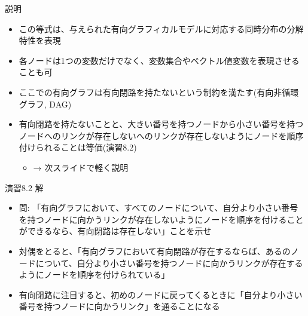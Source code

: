 \begin{frame}{説明}
 \begin{itemize}
  \item この等式は、与えられた有向グラフィカルモデルに対応する同時分布の分解特性を表現
  \item 各ノードは1つの変数だけでなく、変数集合やベクトル値変数を表現させることも可
  \item ここでの有向グラフは有向閉路を持たないという制約を満たす(有向非循環グラフ, DAG)
  \item 有向閉路を持たないことと、大きい番号を持つノードから小さい番号を持つノードへのリンクが存在しないへのリンクが存在しないようにノードを順序付けられることは等価(演習8.2)
        \begin{itemize}
         \item → 次スライドで軽く説明
        \end{itemize}
 \end{itemize}
\end{frame}

\begin{frame}{演習8.2 解}
 \begin{itemize}
  \item 問: 「有向グラフにおいて、すべてのノードについて、自分より小さい番号を持つノードに向かうリンクが存在しないようにノードを順序を付けることができるなら、有向閉路は存在しない」ことを示せ
  \item 対偶をとると、「有向グラフにおいて有向閉路が存在するならば、あるのノードについて、自分より小さい番号を持つノードに向かうリンクが存在するようにノードを順序を付けられている」
  \item 有向閉路に注目すると、初めのノードに戻ってくるときに「自分より小さい番号を持つノードに向かうリンク」を通ることになる
 \end{itemize}
\end{frame}
